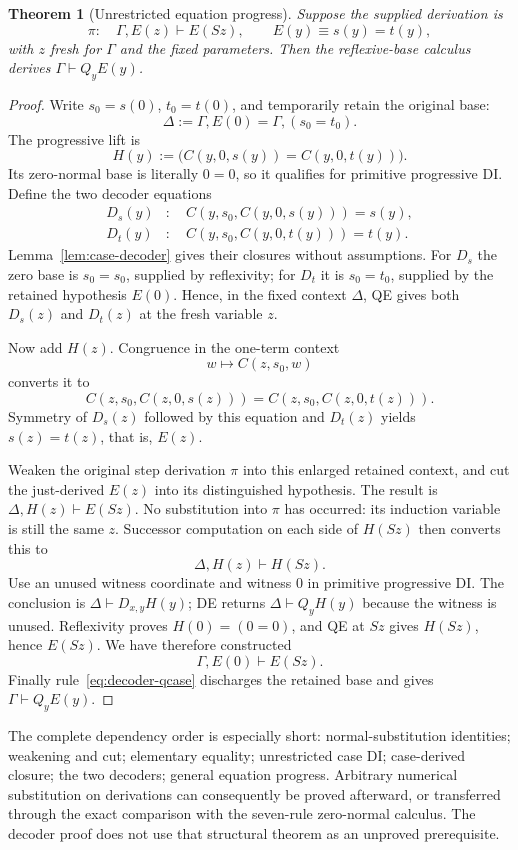 \documentclass[11pt,a4paper]{article}
\newtheorem{theorem}{Theorem}[section]
\theoremstyle{definition}
\begin{document}
\begin{theorem}[Unrestricted equation progress]
\label{thm:decoder-progress}
Suppose the supplied derivation is
\[
 \pi:\quad\Gamma,E(z)\vdash E(Sz),\qquad
 E(y)\equiv s(y)=t(y),
\]
with $z$ fresh for $\Gamma$ and the fixed parameters.  Then the
reflexive-base calculus derives $\Gamma\vdash Q_yE(y)$.
\end{theorem}
\begin{proof}
Write $s_0=s(0)$, $t_0=t(0)$, and temporarily retain the original base:
\[
 \Delta:=\Gamma,E(0)=\Gamma,(s_0=t_0).
\]
The progressive lift is
\[
 H(y):=\bigl(C(y,0,s(y))=C(y,0,t(y))\bigr).
\]
Its zero-normal base is literally $0=0$, so it qualifies for primitive
progressive DI.  Define the two decoder equations
\begin{align*}
 D_s(y)&:\quad C(y,s_0,C(y,0,s(y)))=s(y),\\
 D_t(y)&:\quad C(y,s_0,C(y,0,t(y)))=t(y).
\end{align*}
Lemma~\ref{lem:case-decoder} gives their closures without assumptions.
For $D_s$ the zero base is $s_0=s_0$, supplied by reflexivity; for
$D_t$ it is $s_0=t_0$, supplied by the retained hypothesis $E(0)$.
Hence, in the fixed context $\Delta$, QE gives both $D_s(z)$ and
$D_t(z)$ at the fresh variable $z$.

Now add $H(z)$.  Congruence in the one-term context
\[
 w\longmapsto C(z,s_0,w)
\]
converts it to
\[
 C(z,s_0,C(z,0,s(z)))
   =C(z,s_0,C(z,0,t(z))).
\]
Symmetry of $D_s(z)$ followed by this equation and $D_t(z)$ yields
$s(z)=t(z)$, that is, $E(z)$.

Weaken the original step derivation $\pi$ into this enlarged retained
context, and cut the just-derived $E(z)$ into its distinguished
hypothesis.  The result is $\Delta,H(z)\vdash E(Sz)$.
No substitution into $\pi$ has occurred: its induction variable is
still the same $z$.  Successor computation on each side of $H(Sz)$
then converts this to
\[
 \Delta,H(z)\vdash H(Sz).
\]
Use an unused witness coordinate and witness $0$ in primitive
progressive DI.  The conclusion is $\Delta\vdash D_{x,y}H(y)$;
DE returns $\Delta\vdash Q_yH(y)$ because the witness is unused.
Reflexivity proves $H(0)=(0=0)$, and QE at $Sz$ gives $H(Sz)$, hence
$E(Sz)$.  We have therefore constructed
\[
 \Gamma,E(0)\vdash E(Sz).
\]
Finally rule~\eqref{eq:decoder-qcase} discharges the retained base and
gives $\Gamma\vdash Q_yE(y)$.
\end{proof}

The complete dependency order is especially short: normal-substitution
identities; weakening and cut; elementary equality; unrestricted case
DI; case-derived closure; the two decoders; general equation progress.
Arbitrary numerical substitution on derivations can consequently be
proved afterward, or transferred through the exact comparison with the
seven-rule zero-normal calculus.  The decoder proof does not use that
structural theorem as an unproved prerequisite.
\end{document}
